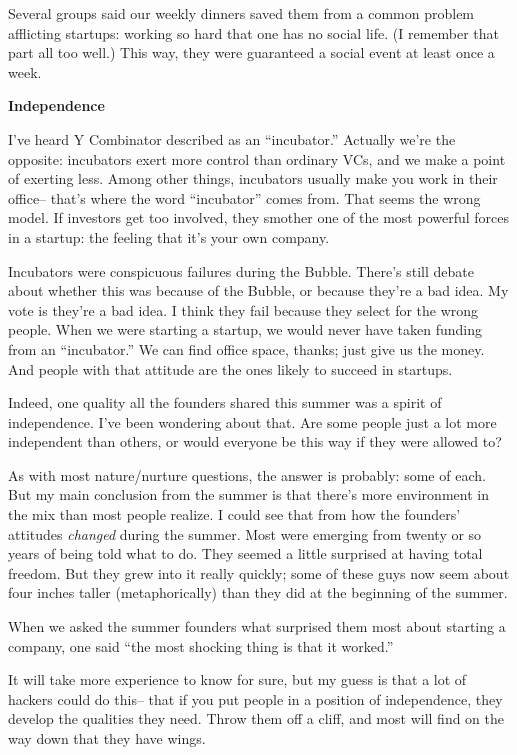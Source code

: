 Several groups said our weekly dinners saved them from a common problem
afflicting startups: working so hard that one has no social life. (I
remember that part all too well.) This way, they were guaranteed a
social event at least once a week.

\textbf{Independence}

I've heard Y Combinator described as an ``incubator.'' Actually we're
the opposite: incubators exert more control than ordinary VCs, and we
make a point of exerting less. Among other things, incubators usually
make you work in their office-- that's where the word ``incubator''
comes from. That seems the wrong model. If investors get too involved,
they smother one of the most powerful forces in a startup: the feeling
that it's your own company.

Incubators were conspicuous failures during the Bubble. There's still
debate about whether this was because of the Bubble, or because they're
a bad idea. My vote is they're a bad idea. I think they fail because
they select for the wrong people. When we were starting a startup, we
would never have taken funding from an ``incubator.'' We can find office
space, thanks; just give us the money. And people with that attitude are
the ones likely to succeed in startups.

Indeed, one quality all the founders shared this summer was a spirit of
independence. I've been wondering about that. Are some people just a lot
more independent than others, or would everyone be this way if they were
allowed to?

As with most nature/nurture questions, the answer is probably: some of
each. But my main conclusion from the summer is that there's more
environment in the mix than most people realize. I could see that from
how the founders' attitudes \emph{changed} during the summer. Most were
emerging from twenty or so years of being told what to do. They seemed a
little surprised at having total freedom. But they grew into it really
quickly; some of these guys now seem about four inches taller
(metaphorically) than they did at the beginning of the summer.

When we asked the summer founders what surprised them most about
starting a company, one said ``the most shocking thing is that it
worked.''

It will take more experience to know for sure, but my guess is that a
lot of hackers could do this-- that if you put people in a position of
independence, they develop the qualities they need. Throw them off a
cliff, and most will find on the way down that they have wings.

